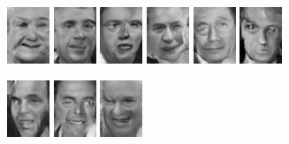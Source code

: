 \begin{figure}[!h]
{        \includegraphics[scale=1]{figures/lfw/appendix2/lfw64x48bw_image0034.png}
        \includegraphics[scale=1]{figures/lfw/appendix2/lfw64x48bw_image0035.png}
        \includegraphics[scale=1]{figures/lfw/appendix2/lfw64x48bw_image0036.png}
        \includegraphics[scale=1]{figures/lfw/appendix2/lfw64x48bw_image0037.png}
        \includegraphics[scale=1]{figures/lfw/appendix2/lfw64x48bw_image0038.png}
        \includegraphics[scale=1]{figures/lfw/appendix2/lfw64x48bw_image0039.png}
    }
    \vspace{0.1cm}
    \centerline{
        \includegraphics[scale=1]{figures/lfw/appendix2/lfw64x48bw_image0040.png}
        \includegraphics[scale=1]{figures/lfw/appendix2/lfw64x48bw_image0041.png}
        \includegraphics[scale=1]{figures/lfw/appendix2/lfw64x48bw_image0042.png}
}
\end{figure}
